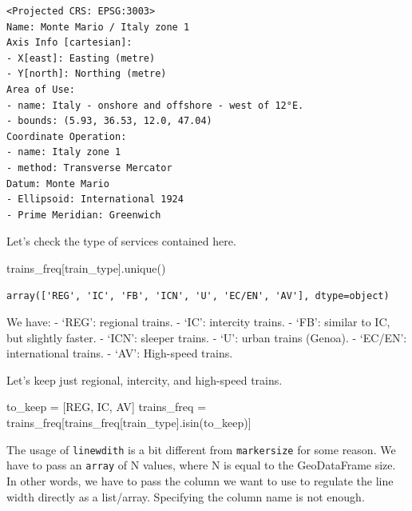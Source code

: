 \documentclass[
  letterpaper,
  DIV=11,
  numbers=noendperiod]{scrreprt}
\newenvironment{Shaded}{\begin{snugshade}}{\end{snugshade}}
\newcommand{\NormalTok}[1]{\textcolor[rgb]{0.00,0.23,0.31}{#1}}
\newcommand{\OperatorTok}[1]{\textcolor[rgb]{0.37,0.37,0.37}{#1}}
\newcommand{\StringTok}[1]{\textcolor[rgb]{0.13,0.47,0.30}{#1}}
\begin{document}
\begin{verbatim}
<Projected CRS: EPSG:3003>
Name: Monte Mario / Italy zone 1
Axis Info [cartesian]:
- X[east]: Easting (metre)
- Y[north]: Northing (metre)
Area of Use:
- name: Italy - onshore and offshore - west of 12°E.
- bounds: (5.93, 36.53, 12.0, 47.04)
Coordinate Operation:
- name: Italy zone 1
- method: Transverse Mercator
Datum: Monte Mario
- Ellipsoid: International 1924
- Prime Meridian: Greenwich
\end{verbatim}

Let's check the type of services contained here.

\begin{Shaded}
\begin{Highlighting}[]
\NormalTok{trains\_freq[}\StringTok{\textquotesingle{}train\_type\textquotesingle{}}\NormalTok{].unique()}
\end{Highlighting}
\end{Shaded}

\begin{verbatim}
array(['REG', 'IC', 'FB', 'ICN', 'U', 'EC/EN', 'AV'], dtype=object)
\end{verbatim}

We have: - `REG': regional trains. - `IC': intercity trains. - `FB':
similar to IC, but slightly faster. - `ICN': sleeper trains. - `U':
urban trains (Genoa). - `EC/EN': international trains. - `AV':
High-speed trains.

Let's keep just regional, intercity, and high-speed trains.

\begin{Shaded}
\begin{Highlighting}[]
\NormalTok{to\_keep }\OperatorTok{=}\NormalTok{ [}\StringTok{\textquotesingle{}REG\textquotesingle{}}\NormalTok{, }\StringTok{\textquotesingle{}IC\textquotesingle{}}\NormalTok{, }\StringTok{\textquotesingle{}AV\textquotesingle{}}\NormalTok{]}
\NormalTok{trains\_freq }\OperatorTok{=}\NormalTok{ trains\_freq[trains\_freq[}\StringTok{\textquotesingle{}train\_type\textquotesingle{}}\NormalTok{].isin(to\_keep)]}
\end{Highlighting}
\end{Shaded}

The usage of \texttt{linewdith} is a bit different from
\texttt{markersize} for some reason. We have to pass an \texttt{array}
of N values, where N is equal to the GeoDataFrame size. In other words,
we have to pass the column we want to use to regulate the line width
directly as a list/array. Specifying the column name is not enough.
\end{document}
